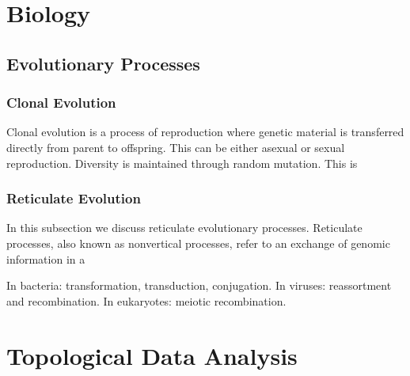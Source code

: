 

\section{Biology}

\subsection{Evolutionary Processes}

\subsubsection{Clonal Evolution}

Clonal evolution is a process of reproduction where genetic material is transferred directly from parent to offspring.
This can be either asexual or sexual reproduction.
Diversity is maintained through random mutation.
This is 

\subsubsection{Reticulate Evolution}

In this subsection we discuss reticulate evolutionary processes.
Reticulate processes, also known as nonvertical processes, refer to an exchange of genomic information in a 

In bacteria: transformation, transduction, conjugation.
In viruses: reassortment and recombination.
In eukaryotes: meiotic recombination.



\section{Topological Data Analysis}

